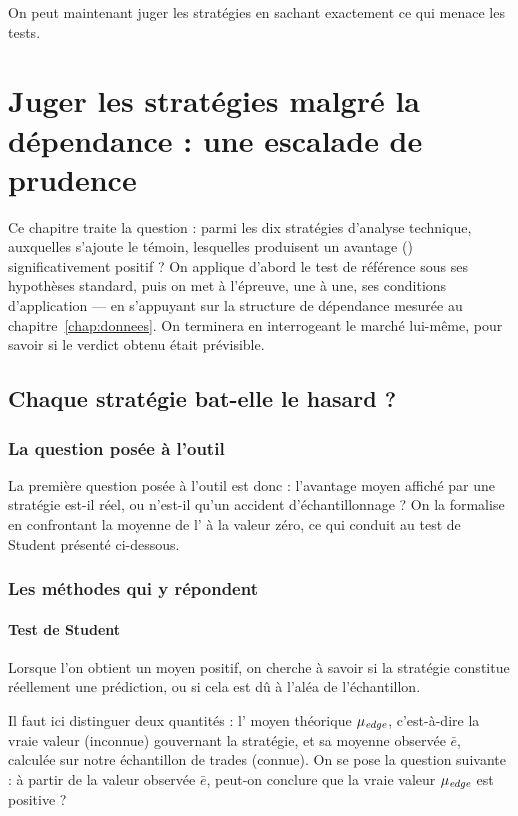 On peut maintenant juger les stratégies en sachant exactement ce qui menace
les tests.
\chapter{Juger les stratégies malgré la dépendance : une escalade de prudence}
\label{chap:juger}

Ce chapitre traite la question : parmi les dix stratégies d'analyse
technique, auxquelles s'ajoute le témoin, lesquelles produisent un avantage
(\edgevar) significativement
positif ? On applique d'abord le test de référence sous ses hypothèses
standard, puis on met à l'épreuve, une à une, ses conditions
d'application — en s'appuyant sur la structure de dépendance mesurée au
chapitre~\ref{chap:donnees}. On terminera en interrogeant le marché
lui-même, pour savoir si le verdict obtenu était prévisible.

\section{Chaque stratégie bat-elle le hasard ?}
\label{sec:b1-etape1}

\subsection{La question posée à l'outil}

La première question posée à l'outil est donc : l'avantage moyen affiché
par une stratégie est-il réel, ou n'est-il qu'un accident
d'échantillonnage ? On la formalise en confrontant la moyenne de
l'\edgevar{} à la valeur zéro, ce qui conduit au test de Student présenté
ci-dessous.

\subsection{Les méthodes qui y répondent}

\subsubsection*{Test de Student}

Lorsque l'on obtient un \edgevar{} moyen positif, on cherche à savoir si la
stratégie constitue réellement une prédiction, ou si cela est dû à l'aléa
de l'échantillon.

Il faut ici distinguer deux quantités : l'\edgevar{} moyen
théorique \(\mu_{\textit{edge}}\), c'est-à-dire la vraie valeur (inconnue)
gouvernant la stratégie, et sa moyenne
observée \(\bar e\), calculée sur notre échantillon de trades
(connue). On se pose la question suivante : à partir de la valeur observée
\(\bar e\), peut-on conclure que la vraie valeur \(\mu_{\textit{edge}}\) est
positive ?

